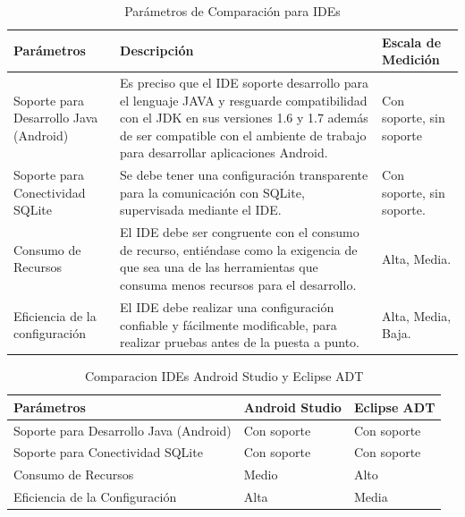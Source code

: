 \begin{table}
	\begin{center}
		\begin{tabular}{|p{4.2cm}|p{4.5cm}|p{4.5cm}|}
			\hline \rowcolor[RGB]{0,102,204} 
			\textcolor{blanco}{\bf Parámetros} &
				\textcolor{blanco}{\bf Descripción} &
				\textcolor{blanco}{\bf Escala de Medición} \\
			\hline \rowcolor[RGB]{224,224,224} 
				Soporte para Desarrollo Java (Android) &
				Es preciso que el IDE soporte desarrollo para el lenguaje JAVA y resguarde compatibilidad con el JDK en sus versiones 1.6 y 1.7 además de ser compatible con el ambiente de trabajo para desarrollar aplicaciones Android. &
				Con soporte, sin soporte \\
      		\hline 
      			Soporte para Conectividad SQLite &
				Se debe tener una configuración transparente para la comunicación con SQLite, supervisada mediante el IDE. &
				Con soporte, sin soporte. \\
      		\hline \rowcolor[RGB]{224,224,224} 
      			Consumo de Recursos &
				El IDE debe ser congruente con el consumo de recurso, entiéndase como la exigencia de que sea una de las herramientas que consuma menos recursos para el desarrollo. &
				Alta, Media. \\
      		\hline 
      			Eficiencia de la configuración  &
				El IDE debe realizar una configuración confiable y fácilmente modificable, para realizar pruebas antes de la puesta a punto. &
				Alta, Media, Baja. \\
      		\hline 
    		\end{tabular}
	\end{center}
	\caption[Parámetros de Comparación para IDEs]{Parámetros de Comparación para IDEs} 
	\label{tab:paramIDEs}
\end{table}

\begin{table}
	\begin{center}
		\begin{tabular}{|p{3cm}|p{3cm}|p{3cm}|}
			\hline \rowcolor[RGB]{0,102,204} 
			\textcolor{blanco}{\bf Parámetros} &
				\textcolor{blanco}{\bf Android Studio} &
				\textcolor{blanco}{\bf Eclipse ADT} \\
			\hline \rowcolor[RGB]{224,224,224} 
				Soporte para Desarrollo Java (Android) &
				Con soporte &
				Con soporte \\
      		\hline 
      			Soporte para Conectividad SQLite &
				Con soporte &
				Con soporte \\
      		\hline \rowcolor[RGB]{224,224,224} 
      			Consumo de Recursos &
				Medio &
				Alto \\
      		\hline 
      			Eficiencia de la Configuración &
				Alta &
				Media \\
      		\hline 
    		\end{tabular}
	\end{center}
	\caption[Comparacion IDEs Android Studio y Eclipse ADT]{Comparacion IDEs Android Studio y Eclipse ADT} 
	\label{tab:comIDEs}
\end{table}

